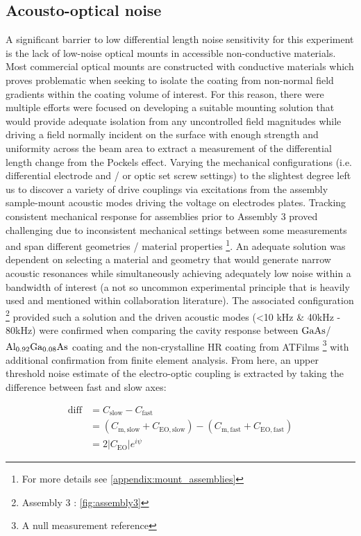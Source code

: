 \subsection{Acousto-optical noise}
A significant barrier to low differential length noise sensitivity for this experiment is the lack of low-noise optical mounts in accessible non-conductive materials. Most commercial optical mounts are constructed with conductive materials which proves problematic when seeking to isolate the coating from non-normal field gradients within the coating volume of interest. For this reason, there were multiple efforts were focused on developing a suitable mounting solution that would provide adequate isolation from any uncontrolled field magnitudes while driving a field normally incident on the surface with enough strength and uniformity across the beam area to extract a measurement of the differential length change from the Pockels effect. Varying the mechanical configurations (i.e. differential electrode and / or optic set screw settings) to the slightest degree left us to discover a variety of drive couplings via excitations from the assembly sample-mount acoustic modes driving the voltage on electrodes plates. Tracking consistent mechanical response for assemblies prior to Assembly 3 proved challenging due to inconsistent mechanical settings between some measurements and span different geometries / material properties \footnote{For more details see \autoref{appendix:mount_assemblies}}. An adequate solution was dependent on selecting a material and geometry that would generate narrow acoustic resonances while simultaneously achieving adequately low noise within a bandwidth of interest (a not so uncommon experimental principle that is heavily used and mentioned within collaboration literature). The associated configuration \footnote{Assembly 3 : \autoref{fig:assembly3}} provided such a solution and the driven acoustic modes (\textless 10 kHz \& 40kHz - 80kHz) were confirmed when comparing the cavity response between $\mathrm{GaAs}$/$\mathrm{Al_{0.92}Ga_{0.08}As}$ coating and the non-crystalline HR coating from ATFilms \footnote{A null measurement reference} with additional confirmation from finite element analysis.  From here, an upper threshold noise estimate of the electro-optic coupling is extracted by taking the difference between fast and slow axes:


\[ 
    \begin{aligned}
	\mathrm{diff} & = C_\mathrm{slow} - C_\mathrm{fast} \\
		      & = (C_\mathrm{m, slow} + C_\mathrm{EO, slow}) - (C_\mathrm{m, fast} + C_\mathrm{EO, fast}) \\
		      & =  2 |C_\mathrm{EO}| e^{i \psi}
    \end{aligned}
\]

